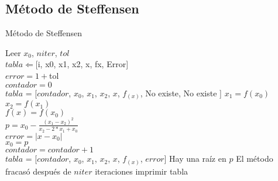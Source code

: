 \documentclass[12pt]{article}
\begin{document}
	\subsection{Método de Steffensen}
    \begin{algorithm}[H]
        \caption{Método de Steffensen}
        \SetAlgoLined
		Leer $x_0$, $niter$, $tol$ \\
		$tabla \Leftarrow $[i, x0, x1, x2, x, fx, Error] \\
        $error = 1 + $tol\\
		$contador = 0$\\
		$tabla$ = [$contador$, $x_{0}$, $x_{1}$, $x_{2}$, $x$, $f_{(x)}$, No existe, No existe ]
        {
            $x_1 = f(x_0)$\\
            $x_2 = f(x_1)$\\
            $f(x) = f(x_0)$\\
            $p = x_0 - \frac{(x_1-x_2)^2}{x_2-2*x_1+x_0}$\\
			$error = |x - x_0|$\\
            $x_0 = p$\\
			$contador = contador + 1$\\
			$tabla$ = [$contador$, $x_{0}$, $x_{1}$, $x_{2}$, $x$, $f_{(x)}$, $error$]
        }
        {Hay una raíz en $p$}
		{El método fracasó después de $niter$ iteraciones}
		imprimir tabla
	\end{algorithm}
\end{document}
